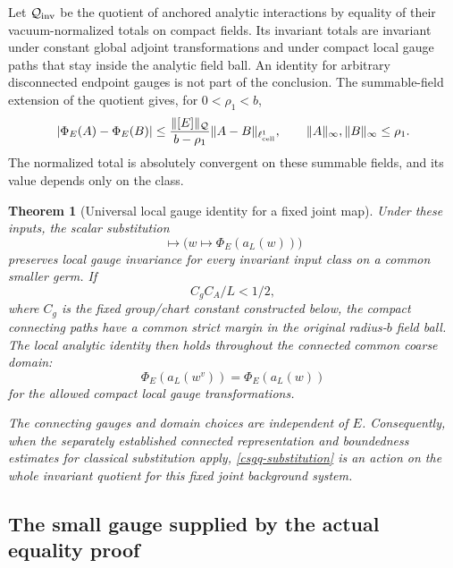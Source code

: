 \documentclass[11pt]{article}
\newtheorem{theorem}{Theorem}[section]
\theoremstyle{remark}
\begin{document}
Let $\mathcal Q_{\rm inv}$ be the quotient of anchored analytic
interactions by equality of their vacuum-normalized totals on compact
fields. Its invariant totals are invariant under constant global
adjoint transformations and under compact local gauge paths that stay
inside the analytic field ball. An identity for arbitrary disconnected
endpoint gauges is not part of the conclusion. The summable-field
extension of the quotient gives, for $0<\rho_1<b$,
\begin{equation}
 |\Phi_E(A)-\Phi_E(B)|
 \le \frac{\|[E]\|_{\mathcal Q}}{b-\rho_1}
                 \|A-B\|_{\ell^1_{\rm cell}},
 \qquad \|A\|_\infty,\|B\|_\infty\le\rho_1.
 \label{csgq-summable-continuity}
\end{equation}
The normalized total is absolutely convergent on these summable fields,
and its value depends only on the class.

\begin{theorem}[Universal local gauge identity for a fixed joint map]
\label{csgq-main}
Under these inputs, the scalar substitution
\begin{equation}
 [E]\longmapsto
       \bigl(w\longmapsto \Phi_E(a_L(w))\bigr)
 \label{csgq-substitution}
\end{equation}
preserves local gauge invariance for every invariant input class on a
common smaller germ. If
\begin{equation}
             C_g C_A/L<1/2,
 \label{csgq-margin-condition}
\end{equation}
where $C_g$ is the fixed group/chart constant constructed below, the
compact connecting paths have a common strict margin in the original
radius-$b$ field ball. The local analytic identity then holds throughout
the connected common coarse domain:
\begin{equation}
             \Phi_E(a_L(w^v))=\Phi_E(a_L(w))
 \label{csgq-gauge-identity}
\end{equation}
for the allowed compact local gauge transformations.

The connecting gauges and domain choices are independent of $E$.
Consequently, when the separately established connected representation
and boundedness estimates for classical substitution apply,
\eqref{csgq-substitution} is an action on the whole invariant quotient
for this fixed joint background system.
\end{theorem}

\subsection{The small gauge supplied by the actual equality proof}
\label{csgq-finite-section}
\end{document}
